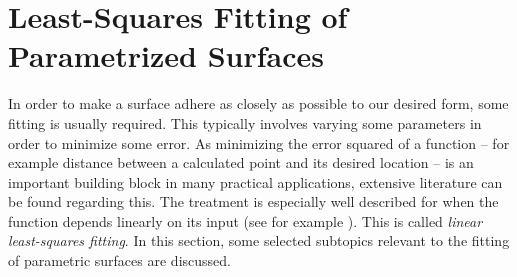 \section{Least-Squares Fitting of Parametrized Surfaces}
\label{sec:LSQfitting}
In order to make a surface adhere as closely as possible to our desired form, some fitting is usually required. This typically involves varying some parameters in order to minimize some error. As minimizing the error squared of a function -- for example distance between a calculated point and its desired location -- is an important building block in many practical applications, extensive literature can be found regarding this. The treatment is especially well described for when the function depends linearly on its input (see for example \cite{becker2011advanced}). This is called \emph{linear least-squares fitting}. In this section, some selected subtopics relevant to the fitting of parametric surfaces are discussed.


